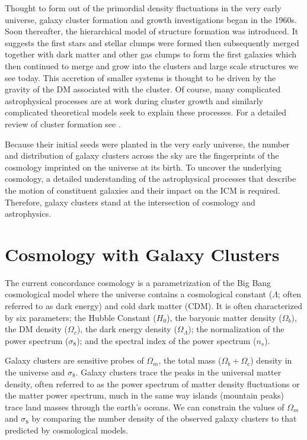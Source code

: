 Thought to form out of the primordial density fluctuations in the very early universe, galaxy cluster formation and growth investigations began in the 1960s. Soon thereafter, the hierarchical model of structure formation \citep{Press1974, Gott1975, White1978} was introduced. It suggests the first stars and stellar clumps were formed then subsequently merged together with dark matter and other gas clumps to form the first galaxies which then continued to merge and grow into the clusters and large scale structures we see today. This accretion of smaller systems is thought to be driven by the gravity of the DM associated with the cluster. Of course, many complicated astrophysical processes are at work during cluster growth and similarly complicated theoretical models seek to explain these processes. For a detailed review of cluster formation see \cite{Kravtsov2012}.

Because their initial seeds were planted in the very early universe, the number and distribution of galaxy clusters across the sky are the fingerprints of the cosmology imprinted on the universe at its birth. To uncover the underlying cosmology, a detailed understanding of the astrophysical processes that describe the motion of constituent galaxies and their impact on the ICM is required. Therefore, galaxy clusters stand at the intersection of cosmology and astrophysics. 

\section{Cosmology with Galaxy Clusters}
The current concordance cosmology is a parametrization of the Big Bang cosmological model where the universe contains a cosmological constant ($\Lambda$; often referred to as dark energy) and cold dark matter (CDM). It is often characterized by six parameters; the Hubble Constant ($H_0$), the baryonic matter density ($\Omega_b$), the DM density ($\Omega_c$), the dark energy density ($\Omega_\Lambda$); the normalization of the power spectrum ($\sigma_8$); and the spectral index of the power spectrum ($n_s$). 

Galaxy clusters are sensitive probes of $\Omega_m$, the total mass ($\Omega_b + \Omega_c$) density in the universe and $\sigma_8$. Galaxy clusters trace the peaks in the universal matter density, often referred to as the power spectrum of matter density fluctuations or the matter power spectrum, much in the same way islands (mountain peaks) trace land masses through the earth's oceans. We can constrain the values of $\Omega_m$ and $\sigma_8$ by comparing the number density of the observed galaxy clusters to that predicted by cosmological models.


